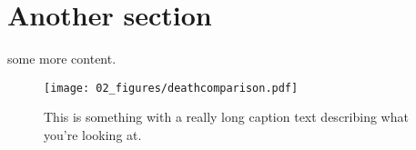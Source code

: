 \documentclass{01_preamble/classicreport}
\begin{document}
\section{Another section}
 some more content.
\blindtext[2]

\begin{wrapfigure}{r}{0.6\textwidth}
    \texttt{[image: 02\_figures/deathcomparison.pdf]}
    \caption[This is something]{This is something with a really long caption text describing what you're looking at.}
\end{wrapfigure}

\blindtext[5]

\newpage
{\small

}
\end{document}
